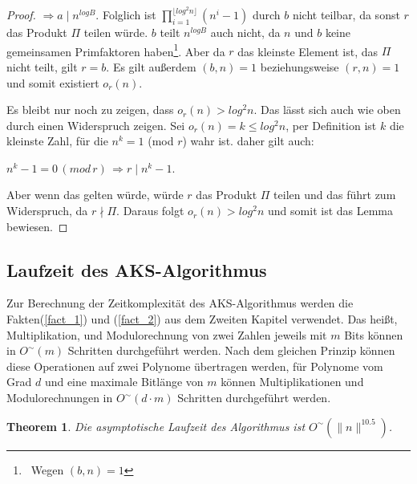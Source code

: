 \documentclass[12pt,oneside]{article}
\newtheorem{theorem}{Theorem}[section]
\theoremstyle{remark}
\theoremstyle{definition}
\begin{document}
\begin{proof}
$\Rightarrow a \mid n^{log B}$.\newline\newline
Folglich ist $\prod_{i = 1}^{\lfloor log^2 n \rfloor}(n^i - 1)$ durch $b$ nicht teilbar, da sonst $r$ das Produkt $\Pi$ teilen würde. $b$ teilt $n^{log B}$ auch nicht, da $n$ und $b$ keine gemeinsamen Primfaktoren haben\footnote{$ \,$ Wegen $(b,n) = 1$}. Aber da $r$ das kleinste Element ist, das $\Pi$ nicht teilt, gilt $r= b$. Es gilt außerdem $(b,n) = 1$ beziehungsweise $(r,n) = 1$ und somit existiert $o_{r}(n)$.\newline

Es bleibt nur noch zu zeigen, dass $o_{r}(n) > log^2 n$. Das lässt sich auch wie oben durch einen Widerspruch zeigen. Sei $o_{r}(n) = k \leq log^2 n$, per Definition ist $k$ die kleinste Zahl, für die $n^k = 1$ (mod $r$) wahr ist. daher gilt auch:\newline\newline
\centerline{$n^k - 1 = 0 \, (mod \, r) \, \Rightarrow r \mid n^k - 1$.}

Aber wenn das gelten würde, würde $r$ das Produkt $\Pi$ teilen und das führt zum Widerspruch, da $r \nmid \Pi$. Daraus folgt $o_{r}(n) > log^2 n$ und somit ist das Lemma bewiesen. 
\end{proof}

\subsection{Laufzeit des AKS-Algorithmus}
Zur Berechnung der Zeitkomplexität des AKS-Algorithmus werden die Fakten(\ref{fact_1}) und (\ref{fact_2}) aus dem Zweiten Kapitel verwendet. Das heißt, Multiplikation, und Modulorechnung von zwei Zahlen jeweils mit $m$ Bits können in $O^{\sim}( m )$ Schritten durchgeführt werden. Nach dem gleichen Prinzip können diese Operationen auf zwei Polynome übertragen werden, für Polynome vom Grad $d$ und eine maximale Bitlänge von  $m$ können Multiplikationen und Modulorechnungen in $O^{\sim}(d \cdot  m )$ Schritten durchgeführt werden.\newline

\begin{theorem}
Die asymptotische Laufzeit des Algorithmus ist $O^{\sim}(\lVert n \rVert^{10.5})$. 
\end{theorem}
\end{document}
